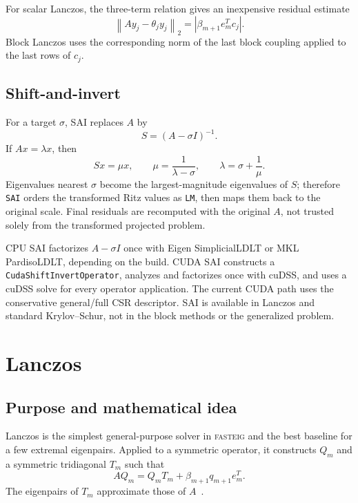 \documentclass[11pt]{article}
\newcommand{\fasteig}{\textsc{fasteig}}
\newcommand{\code}[1]{\texttt{#1}}
\newcommand{\norm}[1]{\left\lVert #1\right\rVert_2}
\begin{document}
For scalar Lanczos, the three-term relation gives an inexpensive residual
estimate
\begin{equation}
  \norm{Ay_j-\theta_jy_j}
    = |\beta_{m+1}e_m^Tc_j|.
  \label{eq:lanczos-residual-estimate}
\end{equation}
Block Lanczos uses the corresponding norm of the last block coupling applied
to the last rows of $c_j$.

\subsection{Shift-and-invert}
\label{sec:sai}

For a target $\sigma$, SAI replaces $A$ by
\begin{equation}
  S=(A-\sigma I)^{-1}.
\end{equation}
If $Ax=\lambda x$, then
\begin{equation}
  Sx=\mu x,\qquad \mu=\frac{1}{\lambda-\sigma},\qquad
  \lambda=\sigma+\frac{1}{\mu}.
\end{equation}
Eigenvalues nearest $\sigma$ become the largest-magnitude eigenvalues of $S$;
therefore \code{SAI} orders the transformed Ritz values as \code{LM}, then maps
them back to the original scale.  Final residuals are recomputed with the
original $A$, not trusted solely from the transformed projected problem.

CPU SAI factorizes $A-\sigma I$ once with Eigen SimplicialLDLT or MKL
PardisoLDLT, depending on the build.  CUDA SAI constructs a
\code{CudaShiftInvertOperator}, analyzes and factorizes once with cuDSS, and
uses a cuDSS solve for every operator application.  The current CUDA path uses
the conservative general/full CSR descriptor.  SAI is available in Lanczos and
standard Krylov--Schur, not in the block methods or the generalized problem.

\section{Lanczos}
\label{sec:lanczos}

\subsection{Purpose and mathematical idea}

Lanczos is the simplest general-purpose solver in \fasteig{} and the best
baseline for a few extremal eigenpairs.  Applied to a symmetric operator, it
constructs $Q_m$ and a symmetric tridiagonal $T_m$ such that
\begin{equation}
  AQ_m = Q_mT_m + \beta_{m+1}q_{m+1}e_m^T.
\end{equation}
The eigenpairs of $T_m$ approximate those of $A$~\cite{lanczos,saad}.
\end{document}
